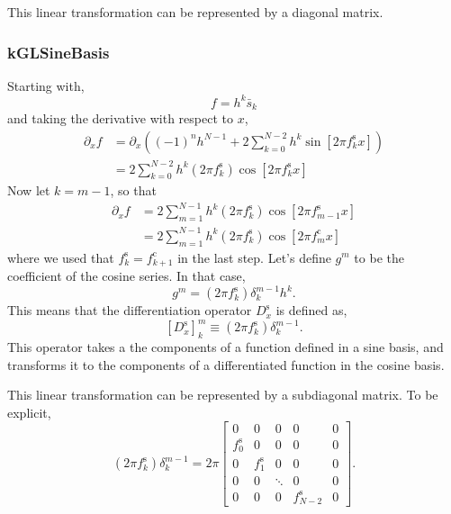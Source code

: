 \documentclass[11pt]{article}
\begin{document}
This linear transformation can be represented by a diagonal matrix.

\subsubsection{kGLSineBasis}

Starting with,
\begin{equation}
f = h^k \bar{s}_k
\end{equation}
and taking the derivative with respect to $x$,
\begin{align}
\partial_x f &= \partial_x  \left( (-1)^n h^{N-1} + 2 \sum_{k=0}^{N-2} h^k \sin \left[ 2 \pi f_k^{\textrm{s}} x \right] \right)\\
&= 2 \sum_{k=0}^{N-2} h^k \left( 2 \pi f_k^{\textrm{s}} \right) \cos \left[ 2 \pi f_k^{\textrm{s}} x \right]
\end{align}
Now let $k=m-1$, so that
\begin{align}
\partial_x f &= 2 \sum_{m=1}^{N-1}  h^k \left( 2 \pi f_k^{\textrm{s}} \right)\cos \left[ 2 \pi f_{m-1}^{\textrm{s}} x \right] \\
&= 2 \sum_{m=1}^{N-1}  h^k \left( 2 \pi f_k^{\textrm{s}} \right) \cos \left[ 2 \pi f_m^{\textrm{c}} x \right]
\end{align}
where we used that $f_k^{\textrm{s}}=f_{k+1}^{\textrm{c}}$ in the last step. Let's define $g^m$ to be the coefficient of the cosine series. In that case,
\begin{equation}
g^m = \left( 2 \pi f_k^{\textrm{s}} \right) \delta^{m-1}_k h^k .
\end{equation}
This means that the differentiation operator $D_x^{\textrm{s}}$ is defined as,
\begin{equation}
\left[D_x^{\textrm{s}}\right]^m_k \equiv \left( 2 \pi f_k^{\textrm{s}} \right) \delta^{m-1}_k.
\end{equation}
This operator takes a the components of a function defined in a sine basis, and transforms it to the components of a differentiated function in the cosine basis.

This linear transformation can be represented by a subdiagonal matrix. To be explicit,
\begin{equation}
\left( 2 \pi f_k^{\textrm{s}} \right) \delta^{m-1}_k = 2 \pi \left[\begin{array}{ccccc}0 & 0 & 0 & 0 & 0 \\f_0^{\textrm{s}} & 0 & 0 & 0 & 0 \\0 & f_1^{\textrm{s}} & 0 & 0 & 0 \\0 & 0 & \ddots & 0 & 0 \\0 & 0 & 0 & f_{N-2}^{\textrm{s}} & 0\end{array}\right].
\end{equation}
\end{document}
